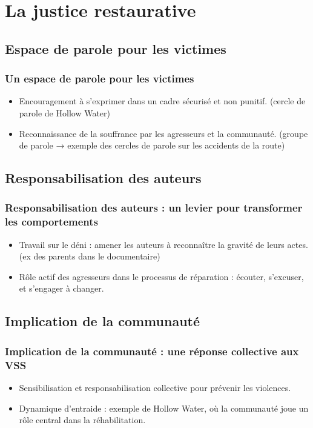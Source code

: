 \documentclass[french]{beamer}
\begin{document}
\section{La justice restaurative}
\subsection{Espace de parole pour les victimes}
\begin{frame}
  \frametitle{Un espace de parole pour les victimes}
  \begin{itemize}
    \item Encouragement à s’exprimer dans un cadre sécurisé et non punitif. (cercle de parole de Hollow Water)
    \item Reconnaissance de la souffrance par les agresseurs et la communauté. (groupe de parole → exemple des cercles de parole sur les accidents de la route)
  \end{itemize}
\end{frame}

\subsection{Responsabilisation des auteurs}
\begin{frame}
  \frametitle{Responsabilisation des auteurs : un levier pour transformer les comportements}
  \begin{itemize}
    \item Travail sur le déni : amener les auteurs à reconnaître la gravité de leurs actes. (ex des parents dans le documentaire)
    \item Rôle actif des agresseurs dans le processus de réparation : écouter, s’excuser, et s’engager à changer.
  \end{itemize}
\end{frame}

\subsection{Implication de la communauté}
\begin{frame}
  \frametitle{Implication de la communauté : une réponse collective aux VSS}
  \begin{itemize}
    \item Sensibilisation et responsabilisation collective pour prévenir les violences.
    \item Dynamique d’entraide : exemple de Hollow Water, où la communauté joue un rôle central dans la réhabilitation.
  \end{itemize}
\end{frame}
\end{document}
